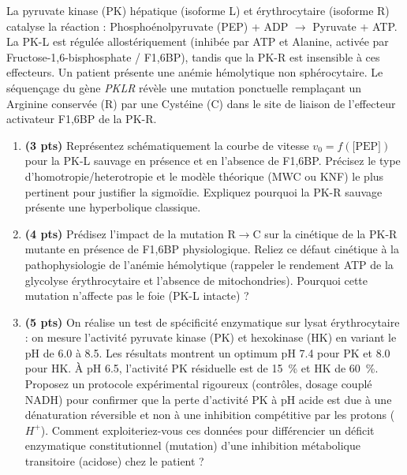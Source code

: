 \documentclass[11pt]{article}
\begin{document}
\begin{exercice}
La pyruvate kinase (PK) hépatique (isoforme L) et érythrocytaire (isoforme R) catalyse la réaction : Phosphoénolpyruvate (PEP) + ADP $\to$ Pyruvate + ATP. La PK-L est régulée allostériquement (inhibée par ATP et Alanine, activée par Fructose-1,6-bisphosphate / F1,6BP), tandis que la PK-R est insensible à ces effecteurs. Un patient présente une anémie hémolytique non sphérocytaire. Le séquençage du gène \textit{PKLR} révèle une mutation ponctuelle remplaçant un Arginine conservée (R) par une Cystéine (C) dans le site de liaison de l'effecteur activateur F1,6BP de la PK-R.

\begin{enumerate}
\item \textbf{(3 pts)} Représentez schématiquement la courbe de vitesse $v_0 = f(\text{[PEP]})$ pour la PK-L sauvage en présence et en l'absence de F1,6BP. Précisez le type d'homotropie/heterotropie et le modèle théorique (MWC ou KNF) le plus pertinent pour justifier la sigmoïdie. Expliquez pourquoi la PK-R sauvage présente une hyperbolique classique.
\item \textbf{(4 pts)} Prédisez l'impact de la mutation R$\to$C sur la cinétique de la PK-R mutante en présence de F1,6BP physiologique. Reliez ce défaut cinétique à la pathophysiologie de l'anémie hémolytique (rappeler le rendement ATP de la glycolyse érythrocytaire et l'absence de mitochondries). Pourquoi cette mutation n'affecte pas le foie (PK-L intacte) ?
\item \textbf{(5 pts)} On réalise un test de spécificité enzymatique sur lysat érythrocytaire : on mesure l'activité pyruvate kinase (PK) et hexokinase (HK) en variant le pH de \num{6,0} à \num{8,5}. Les résultats montrent un optimum pH \num{7,4} pour PK et \num{8,0} pour HK. À pH \num{6,5}, l'activité PK résiduelle est de \SI{15}{\%} et HK de \SI{60}{\%}. Proposez un protocole expérimental rigoureux (contrôles, dosage couplé NADH) pour confirmer que la perte d'activité PK à pH acide est due à une dénaturation réversible et non à une inhibition compétitive par les protons ($H^+$). Comment exploiteriez-vous ces données pour différencier un déficit enzymatique constitutionnel (mutation) d'une inhibition métabolique transitoire (acidose) chez le patient ?
\end{enumerate}
\end{exercice}
\end{document}
